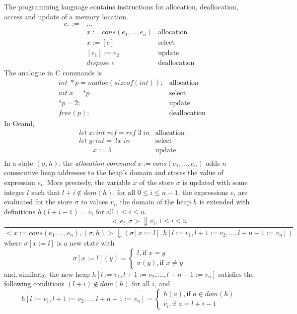 \documentclass[12pt]{article}
\begin{document}
The programming language contains instructions for allocation, deallocation, access and update of a memory location.
\begin{align*}
c ::=& \dots &\\
&x := cons(e_1, \dots, e_n) & \mbox{allocation}\\
&x := [e] & \mbox{select}\\
&[e_1] := e_2 & \mbox{update}\\
&dispose \; e &  \mbox{deallocation}
\end{align*}
The analogue in C commands is 
\begin{align*}
&int \; *p = malloc(sizeof(int)); & \mbox{allocation}\\
&int \; x = *p & \mbox{select}\\
&*p = 2; & \mbox{update}\\
&free(p); &  \mbox{deallocation}
\end{align*}
In Ocaml,
\begin{align*}
&let \; x : int \; ref = ref \; 3 \; in & \mbox{allocation}\\
&let \; y : int = \; !x \; in & \mbox{select}\\
&\qquad x := 5 & \mbox{update}\\
\end{align*}
In a state $(\sigma,h)$, the \textit{allocation command} $x := cons(e_1, \dots, e_n)$ adds $n$ consecutive heap addresses to the heap's domain and stores the value of expression $e_i$. More precisely, the variable $x$ of the store $\sigma$ is updated with some integer $l$ such that $l+i \notin dom(h)$, for all $0 \leq i \leq n-1$, the expressions $e_i$ are evaluated for the store $\sigma$ to values $v_i$, the domain of the heap $h$ is extended with definitions $h(l+i-1) = v_i$ for all $1 \leq i \leq n$.
\[
\frac{<e_i,\sigma>\Downarrow v_i, 1 \leq i \leq n}{<x := cons(e_1, \dots, e_n),(\sigma,h)>\Downarrow (\sigma[x:=l], h[l:=v_1,l+1:=v_2,\dots,l+n-1:=v_n]) }
\]
where $\sigma[x:=l]$ is a new state with 
\[\sigma[x:=l](y)= \begin{cases}
l, \mbox{if } x=y \\
\sigma(y), \mbox{if } x \neq y 
\end{cases} 
\] and, similarly, the new heap $h[l:=v_1,l+1:=v_2,\dots,l+n-1:=v_n]$ satisfies the following conditions $(l+i)\notin dom(h)$ for all $i$, and 
\[
h[l:=v_1,l+1:=v_2,\dots,l+n-1:=v_n] = \begin{cases}
h(a), \mbox{if } a \in dom(h)\\
v_i, \mbox{if } a = l+i-1
\end{cases}
\]
\end{document}
